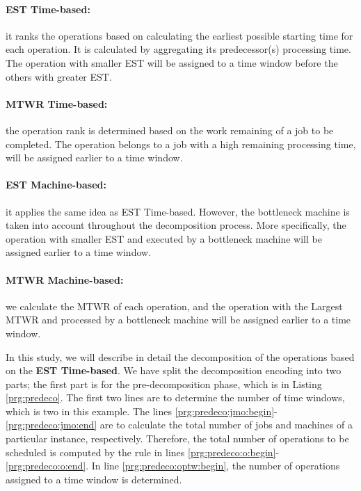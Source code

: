 \documentclass[runningheads]{llncs}
\begin{document}
\paragraph{\textbf{EST Time-based}:} it ranks the operations based on calculating the earliest possible starting time for each operation. It is calculated by aggregating its predecessor(s) processing time. The operation with smaller EST will be assigned to a time window before the others with greater EST.

\paragraph{\textbf{MTWR Time-based}:} the operation rank is determined based on the work remaining of a job to be completed. The operation belongs to a job with a high remaining processing time, will be assigned earlier to a time window.

\paragraph{\textbf{EST Machine-based}:} it applies the same idea as EST Time-based. However, the bottleneck machine is taken into account throughout the decomposition process. More specifically, the operation with smaller EST and executed by a bottleneck machine will be assigned earlier to a time window.

\paragraph{\textbf{MTWR Machine-based}:} we calculate the MTWR of each operation, and the operation with the Largest MTWR and processed by a bottleneck machine will be assigned earlier to a time window.

In this study, we will describe in detail the decomposition of the operations based on the \textbf{EST Time-based}. We have split the decomposition encoding into two parts; the first part is for the pre-decomposition phase, which is in Listing \ref{prg:predeco}. The first two lines are to determine the number of time windows, which is two in this example. The lines \ref{prg:predeco:jmo:begin}-\ref{prg:predeco:jmo:end} are to calculate the total number of jobs and machines of a particular instance, respectively. Therefore, the total number of operations to be scheduled is computed by the rule in lines \ref{prg:predeco:o:begin}-\ref{prg:predeco:o:end}. In line \ref{prg:predeco:optw:begin}, the number of operations assigned to a time window is determined. 
\end{document}
